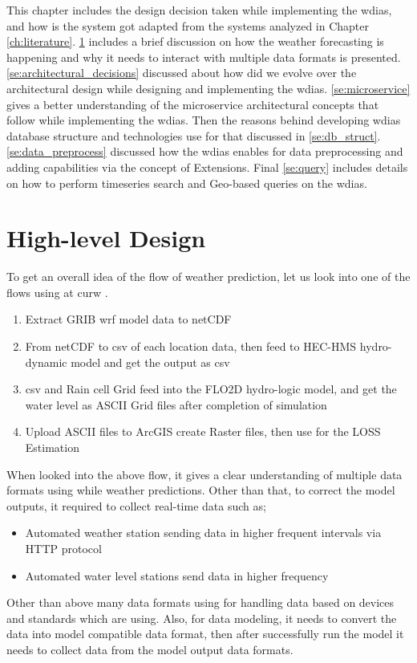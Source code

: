 This chapter includes the design decision taken while implementing the \acrfull{wdias}, and how is the system got adapted from the systems analyzed in Chapter \ref{ch:literature}.
\cref{se:high_level_design} includes a brief discussion on how the weather forecasting is happening and why it needs to interact with multiple data formats is presented.
\cref{se:architectural_decisions} discussed about how did we evolve over the architectural design while designing and implementing the \acrshort{wdias}.
\cref{se:microservice} gives a better understanding of the microservice architectural concepts that follow while implementing the \acrshort{wdias}.
Then the reasons behind developing \acrshort{wdias} database structure and technologies use for that discussed in \cref{se:db_struct}.
\cref{se:data_preprocess} discussed how the \acrshort{wdias} enables for data preprocessing and adding capabilities via the concept of Extensions.
Final \cref{se:query} includes details on how to perform timeseries search and Geo-based queries on the \acrshort{wdias}.

\section{High-level Design}
\label{se:high_level_design}

To get an overall idea of the flow of weather prediction, let us look into one of the flows using at \acrshort{curw} \cite{CUrWSL2017SL}.

\begin{enumerate}
    \item Extract \acrshort{GRIB} \acrshort{wrf} model data to \acrshort{netCDF}
    \item From \acrshort{netCDF} to \acrshort{csv} of each location data, then feed to HEC-HMS hydro-dynamic model and get the output as \acrshort{csv}
    \item \acrshort{csv} and Rain cell Grid feed into the FLO2D hydro-logic model, and get the water level as ASCII Grid files after completion of simulation
    \item Upload ASCII files to ArcGIS create Raster files, then use for the LOSS Estimation
\end{enumerate}
When looked into the above flow, it gives a clear understanding of multiple data formats using while weather predictions.
Other than that, to correct the model outputs, it required to collect real-time data such as;
\begin{itemize}
    \item Automated weather station sending data in higher frequent intervals via HTTP protocol
    \item Automated water level stations send data in higher frequency
\end{itemize}
Other than above many data formats using for handling data based on devices and standards which are using. Also, for data modeling, it needs to convert the data into model compatible data format, then after successfully run the model it needs to collect data from the model output data formats.

